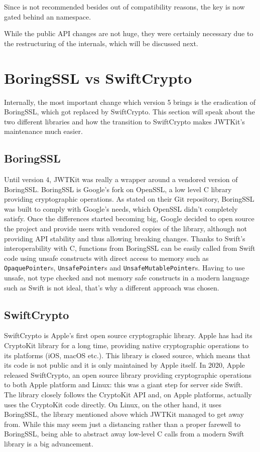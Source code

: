 Since  is not recommended besides out of compatibility reasons, the key is now gated behind an  namespace. \cite{jwtkit}

While the public API changes are not huge, they were certainly necessary due to the restructuring of the internals, which will be discussed next.

\section{BoringSSL vs SwiftCrypto}
Internally, the most important change which version 5 brings is the eradication of BoringSSL, which got replaced by SwiftCrypto. This section will speak about the two different libraries and how the transition to SwiftCrypto makes JWTKit’s maintenance much easier.

\subsection{BoringSSL}
Until version 4, JWTKit was really a wrapper around a vendored version of BoringSSL. BoringSSL is Google's fork on OpenSSL, a low level C library providing cryptographic operations. As stated on their Git repository, BoringSSL was built to comply with Google's needs, which OpenSSL didn't completely satisfy. Once the differences started becoming big, Google decided to open source the project and provide users with vendored copies of the library, although not providing API stability and thus allowing breaking changes. \cite{boringssl}
Thanks to Swift's interoperability with C, functions from BoringSSL can be easily called from Swift code using unsafe constructs with direct access to memory such as \lstinline{OpaquePointer}s, \lstinline{UnsafePointer}s and \lstinline{UnsafeMutablePointer}s. Having to use unsafe, not type checked and not memory safe constructs in a modern language such as Swift is not ideal, that's why a different approach was chosen.

\subsection{SwiftCrypto}
SwiftCrypto is Apple's first open source cryptographic library. Apple has had its CryptoKit library for a long time, providing native cryptographic operations to its platforms (iOS, macOS etc.). This library is closed source, which means that its code is not public and it is only maintained by Apple itself. In 2020, Apple released SwiftCrypto, an open source library providing cryptographic operations to both Apple platform and Linux: this was a giant step for server side Swift. The library closely follows the CryptoKit API and, on Apple platforms, actually uses the CryptoKit code directly. On Linux, on the other hand, it uses BoringSSL, the library mentioned above which JWTKit managed to get away from. While this may seem just a distancing rather than a proper farewell to BoringSSL, being able to abstract away low-level C calls from a modern Swift library is a big advancement.

